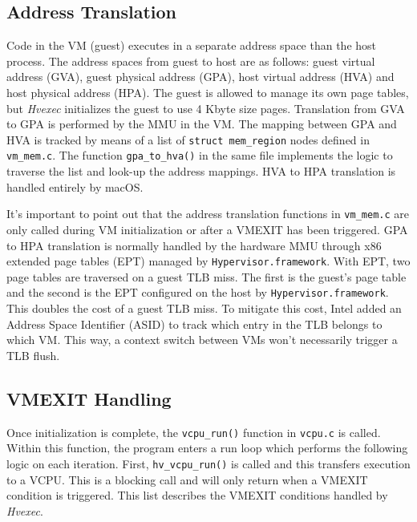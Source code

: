 \documentclass{article}
\newcommand{\PROJNAME}{\textit{Hvexec}}
\begin{document}
\subsection{Address Translation}
Code in the VM (guest) executes in a separate address space than the host process.
The address spaces from guest to host are as follows: guest virtual address (GVA), guest physical address (GPA), host virtual address (HVA) and host physical address (HPA).
The guest is allowed to manage its own page tables, but \PROJNAME{} initializes the guest to use 4 Kbyte size pages.
Translation from GVA to GPA is performed by the MMU in the VM.
The mapping between GPA and HVA is tracked by means of a list of \texttt{struct mem\_region} nodes defined in \texttt{vm\_mem.c}. The function \texttt{gpa\_to\_hva()} in the same file implements the logic to traverse the list and look-up the address mappings. 
HVA to HPA translation is handled entirely by macOS.

It's important to point out that the address translation functions in \texttt{vm\_mem.c} are only called during VM initialization or after a VMEXIT has been triggered.
GPA to HPA translation is normally handled by the hardware MMU through x86 extended page tables (EPT) managed by \texttt{Hypervisor.framework}.
With EPT, two page tables are traversed on a guest TLB miss. The first is the guest's page table and the second is the EPT configured on the host by \texttt{Hypervisor.framework}.
This doubles the cost of a guest TLB miss.
To mitigate this cost, Intel added an Address Space Identifier (ASID) to
track which entry in the TLB belongs to which VM. This way, a context switch between VMs won't necessarily trigger a TLB flush.

\subsection{VMEXIT Handling}
Once initialization is complete, the \texttt{vcpu\_run()} function in \texttt{vcpu.c} is called.
Within this function, the program enters a run loop which performs the following logic on each iteration. 
First, \texttt{hv\_vcpu\_run()} is called and this transfers execution to a VCPU.
This is a blocking call and will only return when a VMEXIT condition is triggered.
This list describes the VMEXIT conditions handled by \PROJNAME{}.
\end{document}

